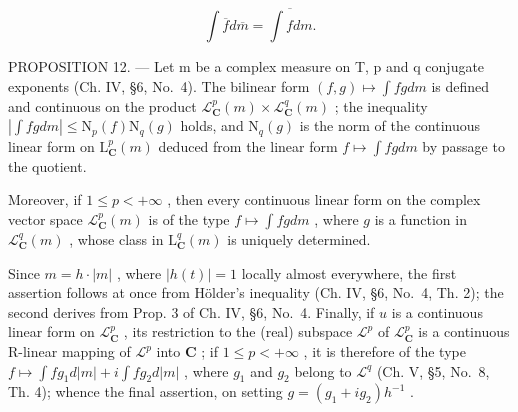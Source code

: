 \[
\int \overline {{f}} d \overline {{m}} = \overline {{\int f d m}}.
\]

PROPOSITION 12. --- Let m be a complex measure on T, p and q conjugate exponents (Ch. IV, §6, No.~4). The bilinear form \((f,g)\mapsto\int fg dm\) is defined and continuous on the product \(\mathcal{L}_{\mathbf{C}}^{p}(m)\times\mathcal{L}_{\mathbf{C}}^{q}(m)\) ; the inequality \(\left|\int fg dm\right|\leqslant\mathrm{N}_{p}(f)\mathrm{N}_{q}(g)\) holds, and \(\mathrm{N}_{q}(g)\) is the norm of the continuous linear form on \(\mathrm{L}_{\mathbf{C}}^{p}(m)\) deduced from the linear form \(f\mapsto\int fg dm\) by passage to the quotient.

Moreover, if \(1 \leqslant p < +\infty\) , then every continuous linear form on the complex vector space \(\mathcal{L}_{\mathbf{C}}^{p}(m)\) is of the type \(f \mapsto \int fg dm\) , where \(g\) is a function in \(\mathcal{L}_{\mathbf{C}}^{q}(m)\) , whose class in \(\mathrm{L}_{\mathbf{C}}^{q}(m)\) is uniquely determined.

Since \(m = h \cdot |m|\) , where \(|h(t)| = 1\) locally almost everywhere, the first assertion follows at once from Hölder's inequality (Ch. IV, §6, No.~4, Th. 2); the second derives from Prop. 3 of Ch. IV, §6, No.~4. Finally, if \(u\) is a continuous linear form on \(\mathcal{L}_{\mathbf{C}}^{p}\) , its restriction to the (real) subspace \(\mathcal{L}^p\) of \(\mathcal{L}_{\mathbf{C}}^{p}\) is a continuous R-linear mapping of \(\mathcal{L}^p\) into \(\mathbf{C}\) ; if \(1 \leqslant p < +\infty\) , it is therefore of the type \(f \mapsto \int fg_1 d|m| + i \int fg_2 d|m|\) , where \(g_1\) and \(g_2\) belong to \(\mathcal{L}^q\) (Ch. V, §5, No.~8, Th. 4); whence the final assertion, on setting \(g = (g_1 + ig_2)h^{-1}\) .

